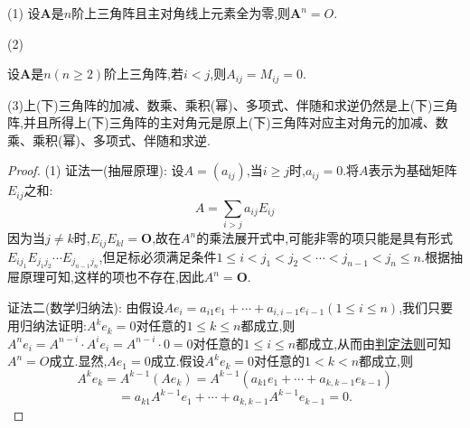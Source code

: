 \documentclass[../../main.tex]{subfiles}%
\begin{document}
\begin{proposition}[上三角阵性质]\label{proposition:上三角阵性质}
(1) 设\(\boldsymbol{A}\)是\(n\)阶上三角阵且主对角线上元素全为零,则\(\boldsymbol{A}^{n}=O\).

\hypertarget{proposition:上三角阵的性质第2条性质}{(2)}
设\(\boldsymbol{A}\)是\(n(n\geqslant 2)\)阶上三角阵,若\(i < j\),则\(A_{ij}=M_{ij}=0\).

(3)上(下)三角阵的加减、数乘、乘积(幂)、多项式、伴随和求逆仍然是上(下)三角阵,并且所得上(下)三角阵的主对角元是原上(下)三角阵对应主对角元的加减、数乘、乘积(幂)、多项式、伴随和求逆.
\end{proposition}
\begin{proof}
(1) {\color{blue}证法一(抽屉原理):}
设\(A=(a_{ij})\),当\(i\geqslant  j\)时,\(a_{ij} = 0\).将\(A\)表示为基础矩阵\(E_{ij}\)之和:
\[
A=\sum_{i>j}a_{ij}E_{ij}
\]
因为当\(j\neq k\)时,\(E_{ij}E_{kl}=\boldsymbol{O}\),故在\(A^{n}\)的乘法展开式中,可能非零的项只能是具有形式\(E_{ij_1}E_{j_1j_2}\cdots E_{j_{n-1}j_{n}}\),但足标必须满足条件\(1\leqslant i<j_1<j_2<\cdots <j_{n-1}<j_n\leqslant n\).根据抽屉原理可知,这样的项也不存在,因此\(A^{n}=\boldsymbol{O}\).

{\color{blue}证法二(数学归纳法):} 
由假设\(Ae_{i}=a_{i1}e_{1}+\cdots +a_{i, i - 1}e_{i - 1}(1\leqslant  i\leqslant  n)\),我们只要用归纳法证明:\(A^{k}e_{k}=0\)对任意的\(1\leqslant  k\leqslant  n\)都成立,则\(A^{n}e_{i}=A^{n-i}\cdot A^ie_i=A^{n-i}\cdot 0=0\)对任意的\(1\leqslant  i\leqslant  n\)都成立,从而由\hyperlink{proposition:矩阵相等的判定法则}{判定法则}可知\(A^{n}=O\)成立.显然,\(Ae_{1}=0\)成立.假设\(A^{k}e_{k}=0\)对任意的\(1 < k < n\)都成立,则
\[
A^{k}e_{k}=A^{k - 1}(Ae_{k})=A^{k - 1}(a_{k1}e_{1}+\cdots +a_{k, k - 1}e_{k - 1})
\]
\[
=a_{k1}A^{k - 1}e_{1}+\cdots +a_{k, k - 1}A^{k - 1}e_{k - 1}=0.
\]


\end{proof}
\end{document}
